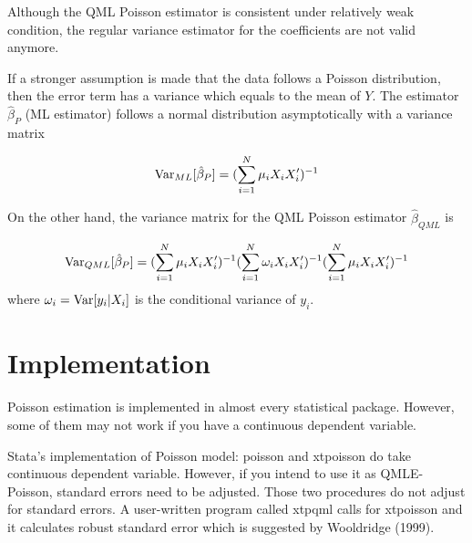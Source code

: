 Although the QML Poisson estimator is consistent under relatively weak condition, the regular variance estimator for the coefficients are not valid anymore.

If a stronger assumption is made that the data follows a Poisson distribution, then the error term has a variance which equals to the mean of $Y$.  The estimator $\hat \beta_P$ (ML estimator) follows a normal distribution asymptotically with a variance matrix



\begin{equation}
 {\rm Var}_{ML} [\hat \beta_P] = (\sum_{i=1}^N \mu_i X_i X_i')^{-1}
\end{equation}


On the other hand, the variance matrix for the  QML Poisson estimator $\hat \beta_{QML}$ is 

\begin{equation}
 {\rm Var}_{QML} [\hat \beta_P] = (\sum_{i=1}^N \mu_i X_i X_i')^{-1} (\sum_{i=1}^N \omega_i X_i X_i')^{-1} (\sum_{i=1}^N \mu_i X_i X_i')^{-1}
\end{equation}
where $\omega_i={\rm Var} [y_i|X_i] $ is the conditional variance of $y_i$.




\section{Implementation}

Poisson estimation is implemented in almost every statistical package.  However, some of them may not work if you have a continuous dependent variable.

Stata's implementation of Poisson model: poisson and xtpoisson do take
continuous dependent variable.  However, if you intend to use it as
QMLE-Poisson, standard errors need to be adjusted.  Those two
procedures do not adjust for standard errors.  A user-written program
called xtpqml calls for xtpoisson and it calculates robust standard
error which is suggested by Wooldridge (1999).

